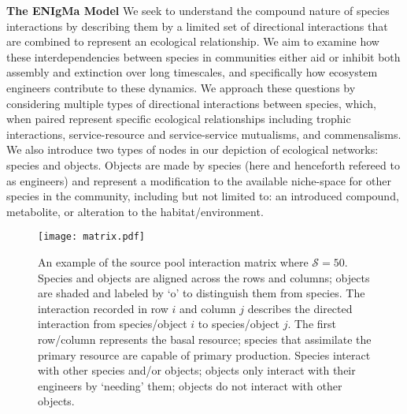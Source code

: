 \documentclass[twocolumn,preprintnumbers,amsmath,amssymb,superscriptaddress]{revtex4}
\begin{document}
\textbf{The ENIgMa Model} We seek to understand the compound nature of species interactions by describing them by a limited set of directional interactions that are combined to represent an ecological relationship.
We aim to examine how these interdependencies between species in communities either aid or inhibit both assembly and extinction over long timescales, and specifically how ecosystem engineers contribute to these dynamics.
We approach these questions by considering multiple types of directional interactions between species, which, when paired represent specific ecological relationships including trophic interactions, service-resource and service-service mutualisms, and commensalisms.
We also introduce two types of nodes in our depiction of ecological networks: species and objects.
Objects are made by species (here and henceforth refereed to as engineers) and represent a modification to the available niche-space for other species in the community, including but not limited to: an introduced compound, metabolite, or alteration to the habitat/environment.



\begin{figure}
\centering
\texttt{[image: matrix.pdf]}
\caption{
An example of the source pool interaction matrix where $\mathcal{S} = 50$. Species and objects are aligned across the rows and columns; objects are shaded and labeled by `o' to distinguish them from species. The interaction recorded in row $i$ and column $j$ describes the directed interaction from species/object $i$ to species/object $j$. The first row/column represents the basal resource; species that assimilate the primary resource are capable of primary production. Species interact with other species and/or objects; objects only interact with their engineers by `needing' them; objects do not interact with other objects.
}
\label{fig:matrix}
\end{figure} 
\end{document}
